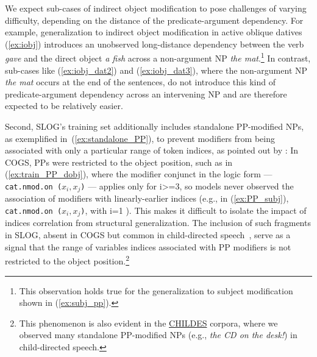 \noindent We expect sub-cases of indirect object modification to pose challenges of varying difficulty, depending on the distance of the predicate-argument dependency. %
For example, generalization to indirect object modification in active oblique datives (\ref{ex:iobj}) introduces an unobserved long-distance dependency between the verb \textit{gave} and the direct object \textit{a fish} across a non-argument NP \textit{the mat}.\footnote{This observation holds true for the generalization to subject modification shown in (\ref{ex:subj_pp}).} In contrast, sub-cases like (\ref{ex:iobj_dat2}) and (\ref{ex:iobj_dat3}), where the non-argument NP \textit{the mat} occurs at the end of the sentences, do not introduce this kind of predicate-argument dependency across an intervening NP and are therefore expected to be relatively easier. 
  

Second, SLOG's training set additionally includes standalone PP-modified NPs, as exemplified in~(\ref{ex:standalone_PP}), to prevent modifiers from being associated with only a particular range of token indices, as pointed out by \citet{wu2023recogs}: In COGS, PPs were restricted to the object position, such as in (\ref{ex:train_PP_dobj}), where the modifier conjunct in the logic form --- \texttt{cat.nmod.on ($x_{i}, x_j$)} --- applies only for i>=3, so models never observed the association of modifiers with linearly-earlier indices (e.g., in (\ref{ex:PP_subj}), \texttt{cat.nmod.on ($x_{i}, x_j$)}, with i=1 ). This makes it difficult to isolate the impact of indices correlation from structural generalization. The inclusion of such fragments in SLOG, absent in COGS but common in child-directed speech~\citep{wells1981learning,cameron2003construction}, serve as a signal that the range of variables indices associated with PP modifiers is not restricted to the object position.\footnote{This phenomenon is also evident in the \href{https://childes.talkbank.org/}{CHILDES} corpora, where we observed many standalone PP-modified NPs (e.g., \textit{the CD on the desk!}) in child-directed speech.}

